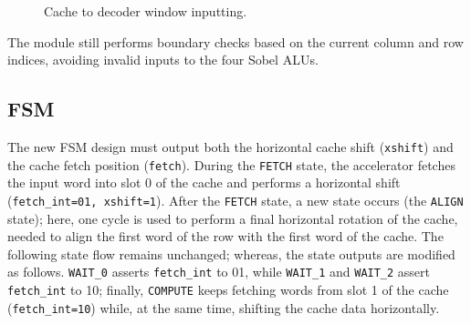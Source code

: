 \begin{figure}[H]
    
    \caption{Cache to decoder window inputting.}
    \label{fig:placeholder}
\end{figure}


The module still performs boundary checks based on the current column and row indices, avoiding invalid inputs to the four Sobel ALUs. 

\subsection{FSM}

The new FSM design must output both the horizontal cache shift (\texttt{xshift}) and the cache fetch position (\texttt{fetch}). During the \texttt{FETCH} state, the accelerator fetches the input word into slot 0 of the cache and performs a horizontal shift (\texttt{fetch\_int=01, xshift=1}). After the \texttt{FETCH} state, a new state occurs (the \texttt{ALIGN} state); here, one cycle is used to perform a final horizontal rotation of the cache, needed to align the first word of the row with the first word of the cache. %
The following state flow remains unchanged; whereas, the state outputs are modified as follows. \texttt{WAIT\_0} asserts \texttt{fetch\_int} to 01, while \texttt{WAIT\_1} and \texttt{WAIT\_2} assert \texttt{fetch\_int} to 10; finally, \texttt{COMPUTE} keeps fetching words from slot 1 of the cache (\texttt{fetch\_int=10}) while, at the same time, shifting the cache data horizontally.

